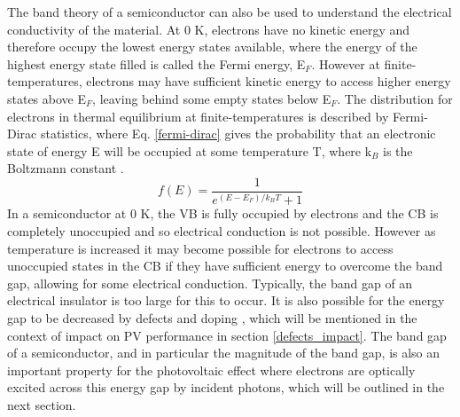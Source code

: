 \documentclass[11pt, twoside]{report}
\begin{document}
The band theory of a semiconductor can also be used to understand the electrical conductivity of the material. At 0 K, electrons have no kinetic energy and therefore occupy the lowest energy states available, where the energy of the highest energy state filled is called the Fermi energy, E$_F$. However at finite-temperatures, electrons may have sufficient kinetic energy to access higher energy states above E$_F$, leaving behind some empty states below E$_F$. The distribution for electrons in thermal equilibrium at finite-temperatures is described by Fermi-Dirac statistics, where Eq. \ref{fermi-dirac} gives the probability that an electronic state of energy E will be occupied at some temperature T, where k$_B$ is the Boltzmann constant \cite{Nelson3}.
\begin{equation}\label{fermi-dirac}
f(E) = \frac{1}{e^{(E-E_F)/k_BT}+1}
\end{equation}
In a semiconductor at 0 K, the VB is fully occupied by electrons and the CB is completely unoccupied and so electrical conduction is not possible. However as temperature is increased it may become possible for electrons to access unoccupied states in the CB if they have sufficient energy to overcome the band gap, allowing for some electrical conduction. Typically, the band gap of an electrical insulator is too large for this to occur. It is also possible for the energy gap to be decreased by defects and doping \cite{Nelson3}, which will be mentioned in the context of impact on PV performance in section \ref{defects_impact}. The band gap of a semiconductor, and in particular the magnitude of the band gap, is also an important property for the photovoltaic effect where electrons are optically excited across this energy gap by incident photons, which will be outlined in the next section.

\end{document}
